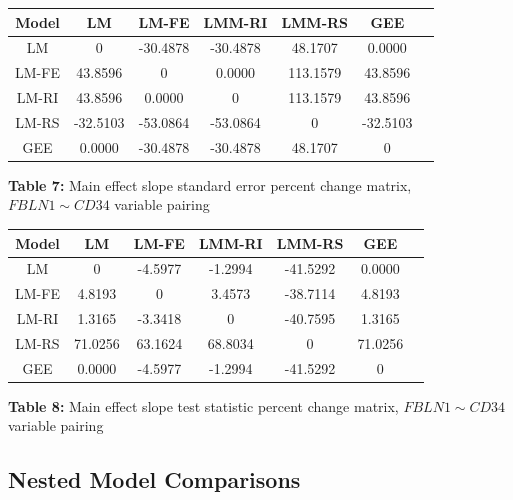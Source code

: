 \documentclass[12pt,]{article}
\begin{document}
\begin{center}
\begin{tabular}{|c||c|c|c|c|c|c|}
\hline
Model & LM & LM-FE & LMM-RI & LMM-RS & GEE \\
\hline
\hline
LM & 0   & -30.4878 & -30.4878  & 48.1707   & 0.0000  \\
\hline
LM-FE & 43.8596  & 0   & 0.0000    & 113.1579  & 43.8596  \\
\hline
LM-RI & 43.8596  & 0.0000   & 0    & 113.1579  & 43.8596  \\
\hline
LM-RS & -32.5103 & -53.0864 & -53.0864  & 0    & -32.5103  \\
\hline
GEE &  0.0000   & -30.4878 & -30.4878  & 48.1707   & 0  \\
\hline
\end{tabular}

\vspace{5pt}

\textbf{Table 7:} Main effect slope standard error percent change matrix, $FBLN1 \sim CD34$ variable pairing
\end{center}

\vspace{20pt}

\begin{center}
\begin{tabular}{|c||c|c|c|c|c|c|}
\hline
Model & LM & LM-FE & LMM-RI & LMM-RS & GEE \\
\hline
\hline
LM & 0  & -4.5977  & -1.2994   & -41.5292  & 0.0000  \\
\hline
LM-FE & 4.8193  & 0   & 3.4573    & -38.7114  & 4.8193  \\
\hline
LM-RI & 1.3165  & -3.3418  & 0    & -40.7595  & 1.3165  \\
\hline
LM-RS & 71.0256 & 63.1624  & 68.8034   & 0    & 71.0256  \\
\hline
GEE & 0.0000  & -4.5977  & -1.2994   & -41.5292  & 0  \\
\hline
\end{tabular}

\vspace{5pt}

\textbf{Table 8:} Main effect slope test statistic percent change matrix, $FBLN1 \sim CD34$ variable pairing
\end{center}

\hypertarget{nested-model-comparisons}{%
\subsection{Nested Model Comparisons}\label{nested-model-comparisons}}
\end{document}
